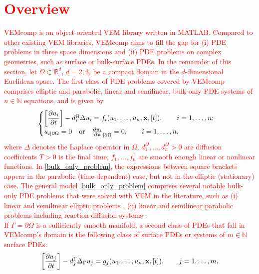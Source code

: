 \documentclass[a4paper]{article}
\newcommand{\red}[1]{\textcolor{red}{#1}}
\begin{document}
\section{\red{Overview}}
\label{sec:overview}
\red{VEMcomp is an object-oriented VEM library written in MATLAB.  Compared to other existing VEM libraries, VEMcomp aims to fill the gap for (i) PDE problems in three space dimensions and (ii) PDE problems on complex geometries, such as surface or bulk-surface PDEs. In the remainder of this section, let $\Omega \subset \mathbb{R}^d$, $d=2,3$, be a compact domain in the $d$-dimensional Euclidean space.  The first class of PDE problems covered by VEMcomp comprises elliptic and parabolic, linear and semilinear, bulk-only PDE systems of $n\in\mathbb{N}$ equations, and is given by
\begin{equation}
\label{bulk_only_problem}
\begin{cases}
\left[\dfrac{\partial u_i}{\partial t}\right] - d_i^\Omega\Delta u_i = f_i(u_1,\dots, u_n, \bold x, [t]),\qquad  i=1,\dots,n;\\
u_{i|\partial \Omega} = 0 \quad \text{or} \quad \frac{\partial u_i}{\partial \bold n}_{|\partial \Omega} = 0, \qquad  i=1,\dots,n,
\end{cases}
\end{equation}
where $\Delta$ denotes the Laplace operator in $\Omega$, $d_1^\Omega,\dots, d_n^\Omega > 0$ are diffusion coefficients $T>0$ is the final time, $f_1, \dots, f_n$ are smooth enough linear or nonlinear functions. In \eqref{bulk_only_problem}, the expressions between square brackets appear in the parabolic (time-dependent) case, but not in the elliptic (stationary) case. The general model \eqref{bulk_only_problem} comprises several notable bulk-only PDE problems that were solved with VEM in the literature, such as (i) linear \cite{beirao2013basic, da2017high,da2019virtual} and semilinear elliptic problems \cite{xiao2022nonconforming},  (ii) linear \cite{vacca2015virtual} and semilinear parabolic problems \cite{adak2019convergence} including reaction-diffusion systems \cite{huang2021posteriori}.\\
If $\Gamma = \partial \Omega$ is a sufficiently smooth manifold, a second class of PDEs that fall in VEMcomp's domain is the following class of surface PDEs or systems of $m\in\mathbb{N}$ surface PDEs:
\begin{equation}
\label{surface_problems}
\left[\frac{\partial u_j}{\partial t}\right] - d_j^\Gamma \Delta_\Gamma u_j = g_j(u_1,\dots,u_n, \bold x, [t]), \qquad j=1,\dots,m,
\end{equation}
}
\end{document}
